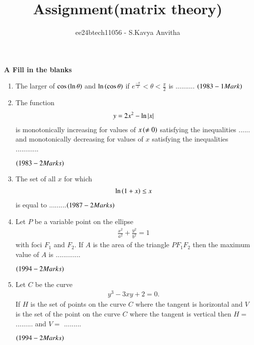 \documentclass[journal,12pt,twocolumn]{IEEEtran}
\theoremstyle{remark}
\begin{document}

\vspace{3cm}

\title{Assignment(matrix theory)}
\author{ee24btech11056 - S.Kavya Anvitha}
\maketitle
\textbf{A Fill in the blanks}\\
\begin{enumerate}
	\item The larger of $\cos \left(\ln \theta\right)$ and 
$\ln \left(\cos \theta\right)$ if 
$e^{\frac{-\pi}{2}}< \theta< \frac{\pi}{2}$
is ..........
		\hfill$\left(1983 - 1 Mark\right)$\\

	\item The function \begin{align*}y=2x^{2}-\ln \left\vert x\right\vert\end{align*}
is monotonically increasing for values of $x\left(\neq0\right)$ satisfying
the inequalities ...... and monotonically decreasing for values of $x$
satisfying the inequalities  ............

		\hfill$\left(1983 - 2 Marks\right)$\\

	\item The set of all $x$ for which \begin{align*}\ln \left(1+x\right) \leq x\end{align*} is equal 
to .........\hfill$\left(1987 - 2 Marks\right)$\\

         \item Let $P$ be a variable point on the ellipse
\begin{align*}\frac{x^2}{a^2}+\frac{y^2}{b^2} = 1\end{align*}
with foci $F_1$ and $F_2$. If $A$ is the area of the triangle $PF_1F_2$ 
then the maximum value of $A$ is .............

		\hfill$\left(1994 - 2 Marks\right)$\\

         \item Let $C$ be the curve \begin{align*}y^3 - 3xy + 2 = 0.\end{align*} If $H$ is the set of
points on the curve $C$ where the tangent is horizontal and $V$ is
the set of the point on the curve $C$ where the tangent is vertical
then $H =$ ......... and $V =$ .........

		\hfill$\left(1994 - 2 Marks\right)$\\
\end{enumerate}
\end{document}
